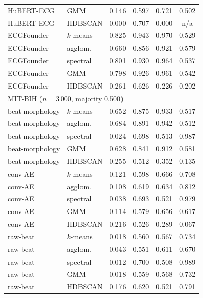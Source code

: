 \documentclass[preprint,11pt]{elsarticle}
\begin{document}
\begin{table}[ht]
\begin{tabular}{llcccc}
HuBERT-ECG   & GMM       & 0.146 & 0.597 & 0.721 & 0.502 \\
HuBERT-ECG   & HDBSCAN   & 0.000 & 0.707 & 0.000 & n/a \\
ECGFounder   & $k$-means & 0.825 & 0.943 & 0.970 & 0.529 \\
ECGFounder   & agglom.   & 0.660 & 0.856 & 0.921 & 0.579 \\
ECGFounder   & spectral  & 0.801 & 0.930 & 0.964 & 0.537 \\
ECGFounder   & GMM       & 0.798 & 0.926 & 0.961 & 0.542 \\
ECGFounder   & HDBSCAN   & 0.261 & 0.626 & 0.226 & 0.202 \\
\midrule
\multicolumn{6}{l}{MIT-BIH ($n = 3\,000$, majority 0.500)} \\
beat-morphology & $k$-means & 0.652 & 0.875 & 0.933 & 0.517 \\
beat-morphology & agglom.   & 0.684 & 0.891 & 0.942 & 0.512 \\
beat-morphology & spectral  & 0.024 & 0.698 & 0.513 & 0.987 \\
beat-morphology & GMM       & 0.628 & 0.841 & 0.912 & 0.581 \\
beat-morphology & HDBSCAN   & 0.255 & 0.512 & 0.352 & 0.135 \\
conv-AE         & $k$-means & 0.121 & 0.598 & 0.666 & 0.708 \\
conv-AE         & agglom.   & 0.108 & 0.619 & 0.634 & 0.812 \\
conv-AE         & spectral  & 0.038 & 0.693 & 0.521 & 0.979 \\
conv-AE         & GMM       & 0.114 & 0.579 & 0.656 & 0.617 \\
conv-AE         & HDBSCAN   & 0.216 & 0.526 & 0.289 & 0.067 \\
raw-beat        & $k$-means & 0.018 & 0.560 & 0.567 & 0.734 \\
raw-beat        & agglom.   & 0.043 & 0.551 & 0.611 & 0.670 \\
raw-beat        & spectral  & 0.012 & 0.700 & 0.508 & 0.989 \\
raw-beat        & GMM       & 0.018 & 0.559 & 0.568 & 0.732 \\
raw-beat        & HDBSCAN   & 0.176 & 0.620 & 0.521 & 0.791 \\
\bottomrule
\end{tabular}
\end{table}



\end{document}

